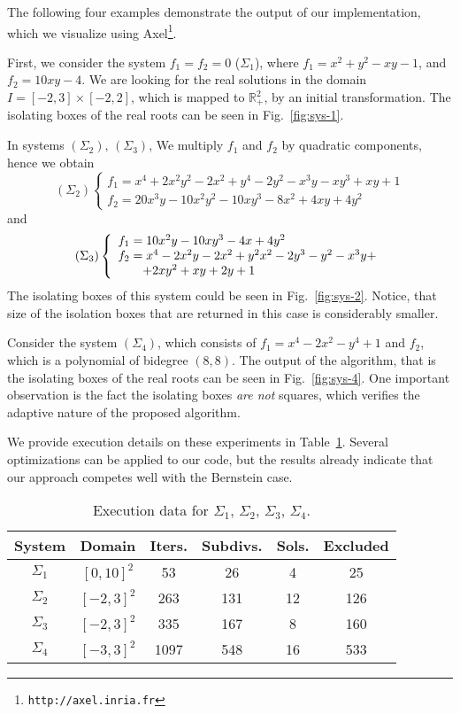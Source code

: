 \documentclass{sig-alternate}
\def\axel{{\sc Axel}}
\def\RR{\mathbb{R}}
\begin{document}
The following four examples demonstrate the output of our implementation, 
which we visualize using \axel\footnote{\texttt{http://axel.inria.fr}}.

First, we consider the system $f_1 = f_2 = 0$ ($\Sigma_1$), 
where $f_1= x^2+y^2-xy-1$, and $f_2= 10xy-4$.
We are looking for the real solutions in the domain 
$I=[-2,3]\times[-2,2]$, which is mapped to $\RR^2_+$, by an initial
transformation. The isolating boxes of the real roots can be seen in
Fig.~\ref{fig:sys-1}. 

In systems $(\Sigma_2),\, (\Sigma_3)$, We multiply $f_1$ and $f_2$ by
quadratic components, hence we obtain
$$
(\Sigma_2) \left\{
\begin{array}{l}
f_1= x^4+2x^2y^2-2x^2+y^4-2y^2-x^3y-xy^3+xy+1\\
f_2= 20x^3y-10x^2y^2-10xy^3-8x^2+4xy+4y^2
\end{array}
\right.
$$
and 
$$
(\Sigma_3)
\left\{
\begin{array}{l}
f_1= 10x^2y-10xy^3-4x+4y^2  \\
f_2= x^4-2x^2y-2x^2+y^2x^2-2y^3-y^2-x^3y+\\ 
\hspace{.7cm} 
+2xy^2+xy+2y+1
\end{array}
\right.
$$
The isolating boxes of this system could be seen in
Fig.~\ref{fig:sys-2}.  Notice, that
size of the isolation boxes that are returned in this case is
considerably smaller. 


Consider the system $(\Sigma_4)$, which 
consists of $f_1= x^4-2x^2-y^4+1$ and $f_2$, which is a polynomial of bidegree $(8,8)$.
The output of the algorithm, that is the isolating boxes of the real roots can be seen in 
Fig.~\ref{fig:sys-4}.
One important observation is the fact the isolating boxes {\em are not} squares,
which verifies the adaptive nature of the proposed algorithm.

We provide execution details on
these experiments in
Table~\ref{tab:exec}. Several
optimizations can be applied to our
code, but the results already
indicate that our approach competes
well with the Bernstein case.

\begin{table} \begin{center}\begin{tabular}{|c|c|c|c|c|c|} \hline System     & Domain   &Iters.& Subdivs. & Sols. & Excluded \\ \hline \hline
$\Sigma_1$ &$[0,10]^2$&53    &26        & 4     & 25   \\ \hline
$\Sigma_2$ &$[-2,3]^2$&263   &131       &12     & 126  \\ \hline
$\Sigma_3$ &$[-2,3]^2$&335   &167       &8      &160   \\ \hline
$\Sigma_4$ &$[-3,3]^2$& 1097 & 548      & 16    &533   \\ \hline
\end{tabular}\end{center}
\caption{Execution data for $\Sigma_1$, $\Sigma_2$, $\Sigma_3$, $\Sigma_4$.}
\label{tab:exec}
\end{table}
\end{document}
